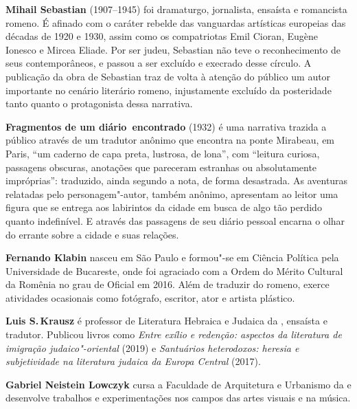 
\textbf{Mihail Sebastian} (1907--1945) foi dramaturgo, jornalista, ensaísta e romancista romeno. É afinado com o caráter rebelde das vanguardas artísticas europeias das décadas de 1920 e 1930, assim como os compatriotas Emil Cioran, Eugène Ionesco e Mircea Eliade. Por ser judeu, Sebastian não teve o reconhecimento de seus contemporâneos, e passou a ser excluído e execrado desse círculo. A publicação da obra de Sebastian traz de volta à atenção do público um autor importante no cenário literário romeno, injustamente excluído da posteridade tanto quanto o protagonista dessa narrativa.

\textbf{Fragmentos de um diário~encontrado} (1932) é uma narrativa trazida a público através de um tradutor anônimo que encontra na ponte Mirabeau, em Paris, ``um caderno de capa preta, lustrosa, de lona'', com ``leitura curiosa, passagens obscuras, anotações que pareceram estranhas ou absolutamente impróprias'': traduzido, ainda segundo a nota, de forma desastrada. As aventuras relatadas pelo personagem"-autor, também anônimo, apresentam ao leitor uma figura que se entrega aos labirintos da cidade em busca de algo tão perdido quanto indefinível. E através das passagens de seu diário pessoal encarna o olhar do errante sobre a cidade e suas relações.


\textbf{Fernando Klabin} nasceu em São Paulo e formou"-se em Ciência Política pela Universidade de Bucareste, onde foi agraciado com a Ordem do Mérito Cultural da Romênia no grau de Oficial em 2016. Além de traduzir do romeno, exerce atividades ocasionais como fotógrafo, escritor, ator e artista plástico.

\textbf{Luis S.\,Krausz} é professor de Literatura Hebraica e Judaica da , ensaísta e tradutor. Publicou livros como \emph{Entre exílio e redenção: aspectos da literatura de imigração judaico"-oriental} (2019) e \emph{Santuários heterodoxos: heresia e subjetividade na literatura judaica da Europa Central} (2017).

\textbf{Gabriel Neistein Lowczyk} cursa a Faculdade de Arquitetura e Urbanismo da  e desenvolve trabalhos e experimentações nos campos das artes visuais e na música.


